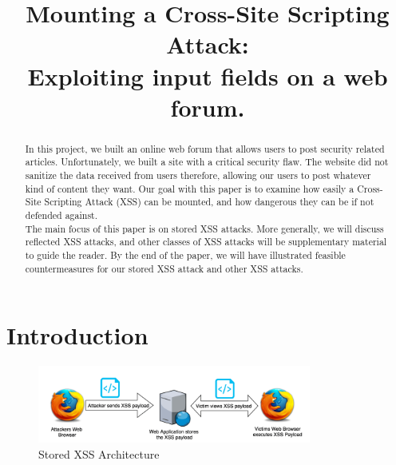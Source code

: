 \documentclass[conference]{IEEEtran}
\begin{document}
\pagestyle{plain}

\title{Mounting a Cross-Site Scripting Attack:\\Exploiting input fields on a web forum.\\
}

\author{
}
\maketitle



\begin{abstract}
In this project, we built an online web forum that allows users to post security related articles. Unfortunately, we built a site with a critical security flaw. The website did not sanitize the data received from users therefore, allowing our users to post whatever kind of content they want. Our goal with this paper is to examine how easily a Cross-Site Scripting Attack (XSS) can be mounted, and how dangerous they can be if not defended against. \\

The main focus of this paper is on stored XSS attacks. More generally, we will discuss reflected XSS attacks, and other classes of XSS attacks will be supplementary material to guide the reader. By the end of the paper, we will have illustrated feasible countermeasures for our stored XSS attack and other XSS attacks.
\end{abstract}

\section{Introduction}
\begin{figure}[h]
\centering
\includegraphics[width = 9cm]{stored-xss-diagram-example.png}

\caption{Stored XSS Architecture}
\end{figure}
\end{document}
